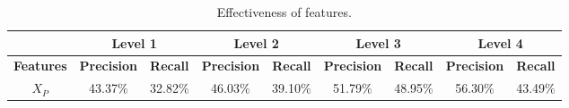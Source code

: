 


\begin{table}[h]
  \small
  \centering
  \caption{Effectiveness of features.}
  \label{tab:features}
  \begin{tabular}{|c|c|c|c|c|c|c|c|c|}
  \hline
                                   & \multicolumn{2}{c|}{\textbf{Level 1}}                     & \multicolumn{2}{c|}{\textbf{Level 2}} & \multicolumn{2}{c|}{\textbf{Level 3}}                     & \multicolumn{2}{c|}{\textbf{Level 4}}                     \\ \hline
  \textbf{Features}                  & \textbf{Precision} & \multicolumn{1}{l|}{\textbf{Recall}} & \textbf{Precision}  & \textbf{Recall} & \textbf{Precision} & \multicolumn{1}{l|}{\textbf{Recall}} & \textbf{Precision} & \multicolumn{1}{l|}{\textbf{Recall}} \\ \hline
  $X_{P}$                            & 43.37$\%$               & 32.82$\%$                                 & 46.03$\%$                & 39.10$\%$            & 51.79$\%$               & 48.95$\%$                                 & 56.30$\%$               & 43.49$\%$                                 \\ \hline

%
%
%



\end{tabular}
\end{table}
